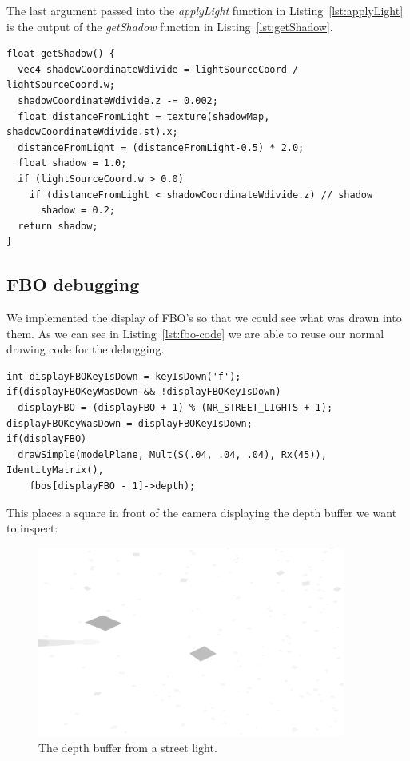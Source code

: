 \documentclass[a4paper,12pt]{article}
\begin{document}
The last argument passed into the \emph{applyLight} function in Listing~\ref{lst:applyLight} is the output of the \emph{getShadow} function in Listing~\ref{lst:getShadow}.

\begin{lstlisting}[label=lst:getShadow,caption= The shader function figuring out whether the texel is in the shade.]
float getShadow() {
  vec4 shadowCoordinateWdivide = lightSourceCoord / lightSourceCoord.w;
  shadowCoordinateWdivide.z -= 0.002;
  float distanceFromLight = texture(shadowMap, shadowCoordinateWdivide.st).x;
  distanceFromLight = (distanceFromLight-0.5) * 2.0;
  float shadow = 1.0;
  if (lightSourceCoord.w > 0.0)
    if (distanceFromLight < shadowCoordinateWdivide.z) // shadow
      shadow = 0.2;
  return shadow;
}
\end{lstlisting}


\subsection{FBO debugging}

We implemented the display of FBO's so that we could see what was drawn into them. As we can see in Listing~\ref{lst:fbo-code} we are able to reuse our normal drawing code for the debugging.

\begin{lstlisting}[label=lst:fbo-code,caption= Switching between the FBO's]
int displayFBOKeyIsDown = keyIsDown('f');
if(displayFBOKeyWasDown && !displayFBOKeyIsDown)
  displayFBO = (displayFBO + 1) % (NR_STREET_LIGHTS + 1);
displayFBOKeyWasDown = displayFBOKeyIsDown;
if(displayFBO)
  drawSimple(modelPlane, Mult(S(.04, .04, .04), Rx(45)), IdentityMatrix(),
    fbos[displayFBO - 1]->depth);
\end{lstlisting}

This places a square in front of the camera displaying the depth buffer we want to inspect:

\begin{figure}[ht]
  \centering
  \includegraphics[width=0.9\textwidth]{fbo}
  \caption{\label{fig:fbo-image} The depth buffer from a street light.}
\end{figure}
\end{document}

